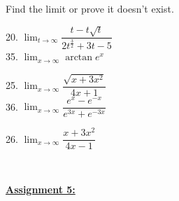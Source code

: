 \documentclass{letter}
\begin{document}
\begin{itemize}
		Find the limit or prove it doesn't exist.\\
		\begin{minipage}[t]{0.3\textwidth}
			20. $\displaystyle \lim_{t \to \infty} \dfrac{ t - t\sqrt{t}}{2t^{\frac{3}{2}} + 3t - 5}$\\
			35. $\displaystyle \lim_{x \to \infty} \arctan e^x$
		\end{minipage}
		\begin{minipage}[t]{0.3\textwidth}
			25. $\displaystyle \lim_{x \to \infty} \dfrac{\sqrt{x + 3x^2}}{4x+1}$\\
			36. $\displaystyle \lim_{x \to \infty} \dfrac{e^x - e^{-x}}{e^{3x} + e^{-3x}}$
		\end{minipage}
		\begin{minipage}[t]{0.3\textwidth}
			26. $\displaystyle \lim_{x \to \infty} \dfrac{x + 3x^2}{4x-1}$
		\end{minipage}\\
	\end{itemize}
	\clearpage
	\large\underline{\textbf{Assignment 5:}}
\end{document}
